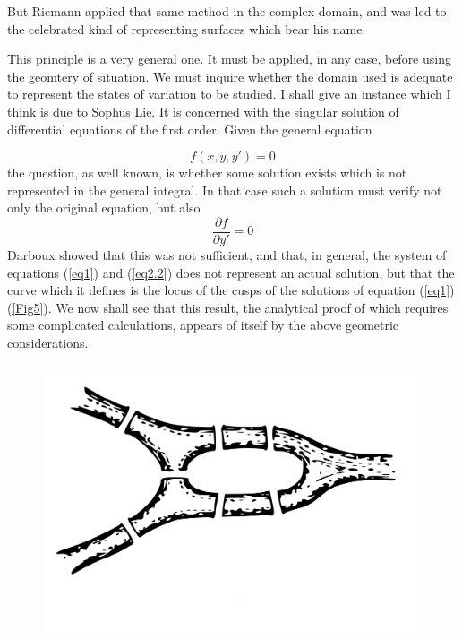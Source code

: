 \documentclass[12pt,oneside]{book}
\begin{document}
But Riemann applied that same method in the complex domain, and was led to the celebrated kind of representing surfaces which bear his name. \par

This principle is a very general one. It must be applied, in any case, before using the geomtery of situation. We must inquire whether the domain used is adequate to represent the states of variation to be studied. I shall give an instance which I think is due to Sophus Lie. It is concerned with the singular solution of differential equations of the first order. Given the general equation

\begin{equation}
    f(x,y,y')=0
    \label{eq1}
\end{equation}
the question, as well known, is whether some solution exists which is not represented in the general integral. In that case such a solution must verify not only the original equation, but also
\begin{equation}
    \frac{\partial f}{\partial y'}=0
    \label{eq2.2}
\end{equation}
Darboux showed that this was not sufficient, and that, in general, the system of equations (\ref{eq1}) and (\ref{eq2.2}) does not represent an actual solution, but that the curve which it defines is the locus of the cusps of the solutions of equation (\ref{eq1}) (\ref{Fig5}). We now shall see that this result, the analytical proof of which requires some complicated calculations, appears of itself by the above geometric considerations. \par

\begin{figure}
    \centering
    \includegraphics[height=8cm]{Fig4.jpeg}
    \caption[]{}
    \label{Fig4}
\end{figure}
\end{document}
